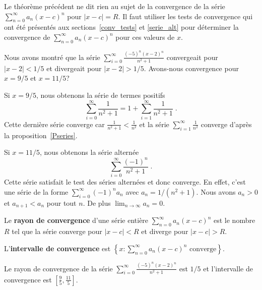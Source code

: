 {\begin{rmk}
Le théorème précédent ne dit rien au sujet de la convergence de la série
$\displaystyle \sum_{n=0}^\infty a_n (x-c)^n$ pour $|x-c|=R$.  Il
faut utiliser les tests de convergence qui ont été présentés aux
sections~\ref{conv_tests} et \ref{serie_alt} pour déterminer la convergence
de $\displaystyle \sum_{n=0}^\infty a_n (x-c)^n$ pour ces valeurs de $x$.
\end{rmk}

\begin{egg} \label{entiere_eggS}
Nous avons montré que la série
$\displaystyle \sum_{i=0}^\infty \frac{(-5)^n(x-2)^n}{n^2+1}$ convergeait
pour $|x-2|<1/5$ et divergeait pour $|x-2|>1/5$.  Avons-nous convergence
pour $x=9/5$ et $x=11/5$?

Si $x=9/5$, nous obtenons la série de termes positifs
\[
\sum_{i=0}^\infty \frac{1}{n^2+1} = 1 + \sum_{i=1}^\infty \frac{1}{n^2+1} \; .
\]
Cette dernière série converge car
$\displaystyle \frac{1}{n^2+1} < \frac{1}{n^2}$ et la série
$\displaystyle \sum_{i=1}^\infty \frac{1}{n^2}$ converge d'après la
proposition~\ref{Pseries}.

Si $x=11/5$, nous obtenons la série alternée
\[
\sum_{i=0}^\infty \frac{(-1)^n}{n^2+1} \; .
\]
Cette série satisfait le test des séries alternées et donc converge.  En
effet, c'est une série de la forme
$\displaystyle \sum_{i=0}^\infty (-1)^n a_n$ avec $a_n = 1/(n^2+1)$.  Nous avons
$a_n>0$ et $a_{n+1} < a_n$ pour tout $n$.  De plus
$\displaystyle \lim_{n\rightarrow \infty} a_n = 0$.
\end{egg}

\begin{defn}
Le {\bfseries rayon de convergence} d'une série entière
$\displaystyle \sum_{n=0}^\infty a_n (x-c)^n$ est le nombre $R$ tel que la
série converge pour $|x-c|<R$ et diverge pour $|x-c|>R$.

L'{\bfseries intervalle de convergence} est
$\displaystyle \left\{x : \sum_{n=0}^\infty a_n (x-c)^n
\text{ converge} \right\}$.
\end{defn}

\begin{egg}
Le rayon de convergence de la série
$\displaystyle \sum_{i=0}^\infty \frac{(-5)^n(x-2)^n}{n^2+1}$ est
$1/5$ et l'intervalle de convergence est
$\displaystyle \left[\frac{9}{5} , \frac{11}{5}\right]$.
\end{egg}

}
